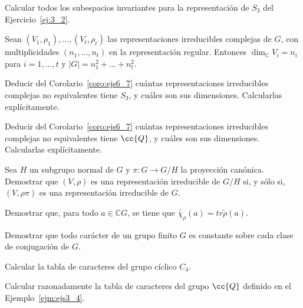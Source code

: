 \begin{ejercicio}
    Calcular todos los subespacios invariantes para la representación de $S_3$ del Ejercicio~\ref{ej:3_2}.
\end{ejercicio}

\begin{coro}\label{coro:ejs6_7}
    Sean $(V_1,\rho_1), \ldots, (V_t,\rho_t)$ las representaciones irreducibles complejas de $G$, con multiplicidades $(n_1,\ldots,n_t)$ en la representación regular. Entonces $\dim_\mathbb{C} V_i = n_i$ para $i = 1,\ldots,t$ y $|G| = n_1^2 + \ldots + n_t^2$.
\end{coro}

\begin{ejercicio}
    Deducir del Corolario~\ref{coro:ejs6_7} cuántas representaciones irreducibles complejas no equivalentes tiene $S_3$, y cuáles son sus dimensiones. Calcularlas explícitamente.
\end{ejercicio}

\begin{ejercicio}
    Deducir del Corolario~\ref{coro:ejs6_7} cuántas representaciones irreducibles complejas no equivalentes tiene $\cc{Q}$, y cuáles son sus dimensiones. Calcularlas explícitamente.
\end{ejercicio}

\begin{ejercicio}
    Sea $H$ un subgrupo normal de $G$ y $\pi:G\to G/H$ la proyección canónica. Demostrar que $(V,\rho)$ es una representación irreducible de $G/H$ si, y sólo si, $(V,\rho\pi)$ es una representación irreducible de $G$.
\end{ejercicio}

\begin{ejercicio}
    Demostrar que, para todo $a\in \mathbb{C}G$, se tiene que $\widetilde{\chi_\rho}(a) = tr\tilde{\rho}(a)$.
\end{ejercicio}

\begin{ejercicio}
    Demostrar que todo carácter de un grupo finito $G$ es constante sobre cada clase de conjugación de $G$.
\end{ejercicio}

\begin{ejercicio}
    Calcular la tabla de caracteres del grupo cíclico $C_4$.
\end{ejercicio}

\begin{ejerciciostar}
    Calcular razonadamente la tabla de caracteres del grupo $\cc{Q}$ definido en el Ejemplo~\ref{ejm:ejs3_4}.
\end{ejerciciostar}

